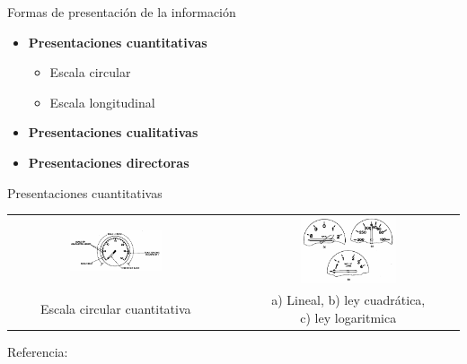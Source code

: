 


\begin{frame}{Formas de presentaci\'on de la informaci\'on}

  \begin{itemize}
  \item {\bf Presentaciones cuantitativas}
    \begin{itemize}
      \item Escala circular
       \item Escala longitudinal
    \end{itemize}
  \item {\bf Presentaciones cualitativas}
  \item {\bf Presentaciones directoras}
  \end{itemize}

\end{frame}

\begin{frame}{Presentaciones cuantitativas
	}

  \begin{tabular}{ccc}
    \includegraphics[width=0.45\textwidth]{imagenes/1.2.clasificacion.instrumentos/escala_circular_cuantitativa.png} & \hspace{3mm}
&     \includegraphics[width=0.45\textwidth]{imagenes/1.2.clasificacion.instrumentos/escala_circular_lineal_no_lineal.png}
\\
	Escala circular cuantitativa & 
& \parbox{0.45\textwidth}{a) Lineal, b) ley cuadr\'atica, \\c) ley logaritmica}
\\
  \end{tabular}

{\tiny Referencia: \cite{pallett1992aircraft}}

\end{frame}

